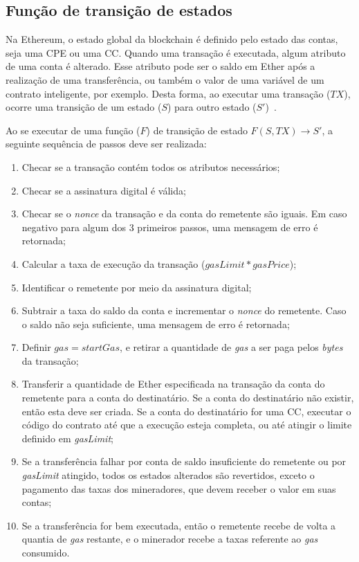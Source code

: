 \subsection{Função de transição de estados} \label{tex:fund:ethereum:transicao}

Na Ethereum, o estado global da blockchain é definido pelo estado das contas, seja uma CPE ou uma CC. Quando uma transação é executada, algum atributo de uma conta é alterado. Esse atributo pode ser o saldo em Ether após a realização de uma transferência, ou também o valor de uma variável de um contrato inteligente, por exemplo. Desta forma, ao executar uma transação ($TX$), ocorre uma transição de um estado ($S$) para outro estado ($S'$)~\cite{ethereum2014whitepaper}.

Ao se executar de uma função ($F$) de transição de estado $F(S, TX) \rightarrow S'$, a seguinte sequência de passos deve ser realizada:
\begin{enumerate}
    \item Checar se a transação contém todos os atributos necessários;
    \item Checar se a assinatura digital é válida; 
    \item Checar se o \textit{nonce} da transação e da conta do remetente são iguais. Em caso negativo para algum dos 3 primeiros passos, uma mensagem de erro é retornada;
    \item Calcular a taxa de execução da transação ($gasLimit * gasPrice$); 
    \item Identificar o remetente por meio da assinatura digital;
    \item Subtrair a taxa do saldo da conta e incrementar o \textit{nonce} do remetente. Caso o saldo não seja suficiente, uma mensagem de erro é retornada;
    \item Definir $gas = startGas$, e retirar a quantidade de \textit{gas} a ser paga pelos \textit{bytes} da transação;
    \item Transferir a quantidade de Ether especificada na transação da conta do remetente para a conta do destinatário. Se a conta do destinatário não existir, então esta deve ser criada. Se a conta do destinatário for uma CC, executar o código do contrato até que a execução esteja completa, ou até atingir o limite definido em \textit{gasLimit};
    \item Se a transferência falhar por conta de saldo insuficiente do remetente ou por \textit{gasLimit} atingido, todos os estados alterados são revertidos, exceto o pagamento das taxas dos mineradores, que devem receber o valor em suas contas;
    \item Se a transferência for bem executada, então o remetente recebe de volta a quantia de \textit{gas} restante, e o minerador recebe a taxas referente ao \textit{gas} consumido.
\end{enumerate}

